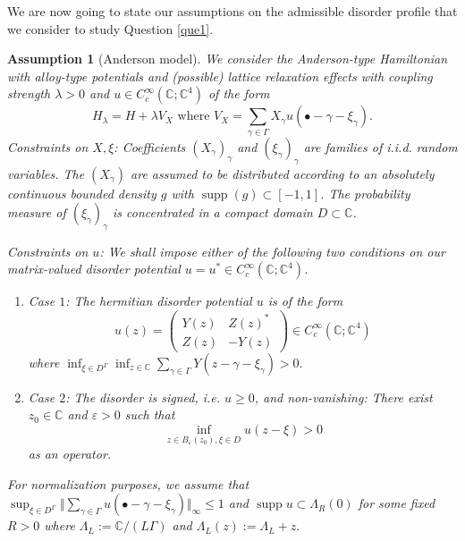 \documentclass[reqno,12pt,letterpaper]{amsart}
\newcommand{\CC}{{\mathbb C}}
\newtheorem{assumption}[theo]{Assumption}
\numberwithin{equation}{section}
\DeclareMathOperator{\supp}{supp}
\begin{document}
We are now going to state our assumptions on the admissible disorder profile that we consider to study Question \ref{que1}.

\begin{assumption}[Anderson model]
\label{ass:Anderson}
We consider the Anderson-type Hamiltonian with \emph{alloy-type} potentials and (possible) lattice relaxation effects with coupling strength $\lambda>0$ and $u \in C^{\infty}_{c}(\CC;\CC^4)$ of the form
\begin{equation}
\label{eq:Anderson_model}
H_{\lambda} = H + \lambda V_{X} \text{ where } V_{X} = \sum_{\gamma \in \Gamma}X_{\gamma} u(\bullet-\gamma-\xi_{\gamma}).
\end{equation}
\emph{Constraints on $X,\xi$:}
Coefficients $(X_{\gamma})_{\gamma}$ and $(\xi_{\gamma})_{\gamma}$ are families of i.i.d. random variables. 
The $(X_{\gamma})$ are assumed to be distributed according to an absolutely continuous bounded density $g$ with $\supp(g) \subset [-1,1]$. The probability measure of $(\xi_{\gamma})_{\gamma}$ is concentrated in a compact domain $D \subset \CC$. 

\emph{Constraints on $u$:} We shall impose either of the following two conditions on our matrix-valued disorder potential $u=u^* \in C^{\infty}_c(\CC;\CC^4)$.  
\begin{enumerate}
\item \emph{Case $1$:} The hermitian disorder potential $u$ is of the form
\begin{equation}
\label{eq:subtle}
 u(z) = \begin{pmatrix} Y(z) & Z(z)^* \\ Z(z) & -Y(z) \end{pmatrix} \in C^{\infty}_{c}(\CC;\CC^4)
 \end{equation}
where $ \inf_{\xi \in D^{\Gamma}} \inf_{z \in \CC} \sum_{\gamma \in \Gamma} Y(z-\gamma-\xi_{\gamma}) >0.$
\item \emph{Case $2$:} The disorder is signed, i.e. $u \ge 0$, and non-vanishing: There exist $z_0 \in \CC$ and $\varepsilon>0$ such that
\begin{equation}
\label{eq:less_subtle}
\inf_{z \in B_{\varepsilon}(z_0),\xi \in D}u(z-\xi) >0
\end{equation} as an operator. 
\end{enumerate}
For normalization purposes, we assume that $\sup_{\xi \in D^{\Gamma}} \Vert \sum_{\gamma \in \Gamma} u(\bullet-\gamma-\xi_{\gamma}) \Vert_{\infty}\le 1$ and $\supp u \subset \Lambda_R(0)$ for some fixed $R>0$ where $\Lambda_L :=\CC/(L\Gamma)$ and $\Lambda_L(z):=\Lambda_L+z.$
\end{assumption}
\end{document}
